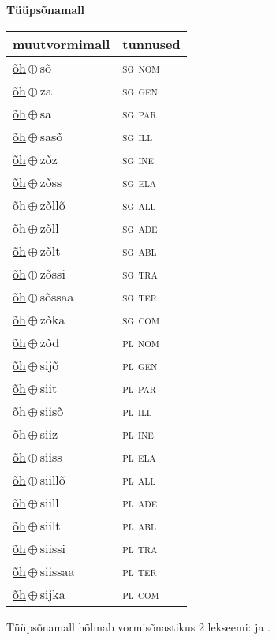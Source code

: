 

\vspace{3.5em}
\noindent \begin{minipage}{\textwidth}
\noindent \textbf{Tüüpsõnamall \,}\\

\begin{sideways}
\begin{tabular}{l l}
muutvormimall & tunnused \\
\hline
\underline{õh}\,$\oplus$\,sõ & \textsc{ sg nom } \\
\underline{õh}\,$\oplus$\,za & \textsc{ sg gen } \\
\underline{õh}\,$\oplus$\,sa & \textsc{ sg par } \\
\underline{õh}\,$\oplus$\,sasõ & \textsc{ sg ill } \\
\underline{õh}\,$\oplus$\,zõz & \textsc{ sg ine } \\
\underline{õh}\,$\oplus$\,zõss & \textsc{ sg ela } \\
\underline{õh}\,$\oplus$\,zõllõ & \textsc{ sg all } \\
\underline{õh}\,$\oplus$\,zõll & \textsc{ sg ade } \\
\underline{õh}\,$\oplus$\,zõlt & \textsc{ sg abl } \\
\underline{õh}\,$\oplus$\,zõssi & \textsc{ sg tra } \\
\underline{õh}\,$\oplus$\,sõssaa & \textsc{ sg ter } \\
\underline{õh}\,$\oplus$\,zõka & \textsc{ sg com } \\
\underline{õh}\,$\oplus$\,zõd & \textsc{ pl nom } \\
\underline{õh}\,$\oplus$\,sijõ & \textsc{ pl gen } \\
\underline{õh}\,$\oplus$\,siit & \textsc{ pl par } \\
\underline{õh}\,$\oplus$\,siisõ & \textsc{ pl ill } \\
\underline{õh}\,$\oplus$\,siiz & \textsc{ pl ine } \\
\underline{õh}\,$\oplus$\,siiss & \textsc{ pl ela } \\
\underline{õh}\,$\oplus$\,siillõ & \textsc{ pl all } \\
\underline{õh}\,$\oplus$\,siill & \textsc{ pl ade } \\
\underline{õh}\,$\oplus$\,siilt & \textsc{ pl abl } \\
\underline{õh}\,$\oplus$\,siissi & \textsc{ pl tra } \\
\underline{õh}\,$\oplus$\,siissaa & \textsc{ pl ter } \\
\underline{õh}\,$\oplus$\,sijka & \textsc{ pl com } \\
\end{tabular}
\end{sideways}
\label{tab:tüüpsõnamall-õhsõ}

\end{minipage}

 
\vspace{1em}
\noindent Tüüpsõnamall  hõlmab vormisõnastikus 2 lekseemi:  ja .
